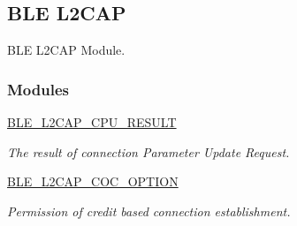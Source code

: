 \hypertarget{group___b_l_e___l2_c_a_p}{}\subsection{B\+LE L2\+C\+AP}
\label{group___b_l_e___l2_c_a_p}


B\+LE L2\+C\+AP Module.  


\subsubsection*{Modules}
\begin{DoxyCompactItemize}
\item 
\hyperlink{group___b_l_e___l2_c_a_p___c_p_u___r_e_s_u_l_t}{B\+L\+E\+\_\+\+L2\+C\+A\+P\+\_\+\+C\+P\+U\+\_\+\+R\+E\+S\+U\+LT}
\begin{DoxyCompactList}\small\item\em The result of connection Parameter Update Request. \end{DoxyCompactList}\item 
\hyperlink{group___b_l_e___l2_c_a_p___c_o_c___o_p_t_i_o_n}{B\+L\+E\+\_\+\+L2\+C\+A\+P\+\_\+\+C\+O\+C\+\_\+\+O\+P\+T\+I\+ON}
\begin{DoxyCompactList}\small\item\em Permission of credit based connection establishment. \end{DoxyCompactList}\end{DoxyCompactItemize}
